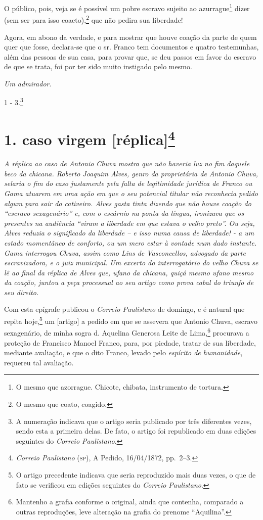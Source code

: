 O público, pois, veja se é possível um pobre escravo sujeito ao
azurrague\footnote{ O mesmo que azorrague. Chicote, chibata,
  instrumento de tortura.} dizer (sem ser para isso coacto),\footnote{
  O mesmo que coato, coagido.} que não pedira sua liberdade!

Agora, em abono da verdade, e para mostrar que houve coação da parte de
quem quer que fosse, declara-se que o sr. Franco tem documentos e quatro
testemunhas, além das pessoas de sua casa, para provar que, se deu
passos em favor do escravo de que se trata, foi por ter sido muito
instigado pelo mesmo.

\emph{Um admirador}.

1 - 3.\footnote{ A numeração indicava que o artigo seria publicado por
  três diferentes vezes, sendo esta a primeira delas. De fato, o artigo
  foi republicado em duas edições seguintes do \emph{Correio
  Paulistano}.}

\chapter{1. caso virgem {[}réplica{]}\footnote{\emph{Correio Paulistano} (\textsc{sp}), A Pedido, 16/04/1872,
  pp.~2--3.}} %

\begin{didascalia}
\emph{A réplica ao caso de Antonio Chuva mostra que não haveria luz no
fim daquele beco da chicana. Roberto Joaquim Alves, genro da
proprietária de Antonio Chuva, selaria o fim do caso justamente pela
falta de legitimidade jurídica de Franco ou Gama atuarem em uma ação em
que o seu potencial titular não reconhecia pedido algum para sair do
cativeiro. Alves gasta tinta dizendo que não houve coação do ``escravo
sexagenário'' e, com o escárnio na ponta da língua, ironizava que os
presentes na audiência ``viram a liberdade em que estava o velho preto''.
Ou seja, Alves reduzia o significado da liberdade -- e isso numa causa
de liberdade! - a um estado momentâneo de conforto, ou um mero estar à
vontade num dado instante. Gama interrogou Chuva, assim como Lins de
Vasconcellos, advogado da parte escravizadora, e o juiz municipal. Um
excerto do interrogatório do velho Chuva se lê ao final da réplica de
Alves que, ufano da chicana, quiçá mesmo ufano mesmo da coação, juntou a
peça processual ao seu artigo como prova cabal do triunfo de seu
direito.}
\end{didascalia}


Com esta epígrafe publicou o \emph{Correio Paulistano} de domingo, e é
natural que repita hoje,\footnote{ O artigo precedente indicava que
  seria reproduzido mais duas vezes, o que de fato se verificou em
  edições seguintes do \emph{Correio Paulistano}.} um {[}artigo{]} a
pedido em que se assevera que Antonio Chuva, escravo sexagenário, de
minha sogra d. Aquelina Generosa Leite de Lima,\footnote{ Mantenho a
  grafia conforme o original, ainda que contenha, comparado a outras
  reproduções, leve alteração na grafia do prenome ``Aquilina''.} procurava
a proteção de Francisco Manoel Franco, para, por piedade, tratar de sua
liberdade, mediante avaliação, e que o dito Franco, levado pelo
\emph{espírito de humanidade}, requereu tal avaliação.

